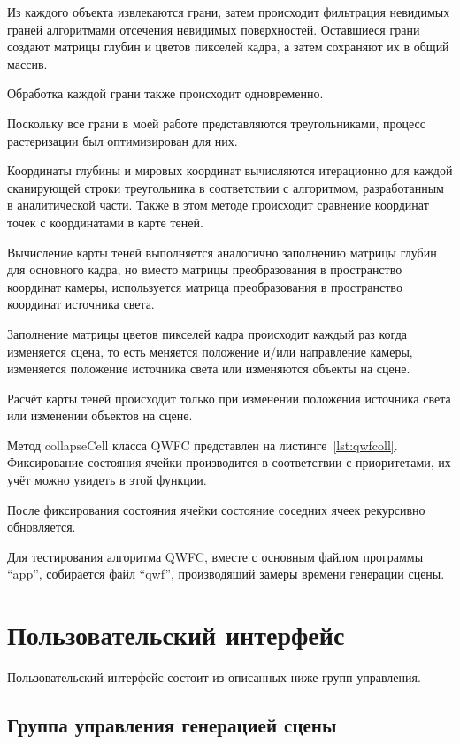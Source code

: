 Из каждого объекта извлекаются грани, затем происходит фильтрация невидимых граней алгоритмами отсечения невидимых поверхностей. Оставшиеся грани создают матрицы глубин и цветов пикселей кадра, а затем сохраняют их в общий массив. 

Обработка каждой грани также происходит одновременно. 

Поскольку все грани в моей работе представляются треугольниками, процесс растеризации был оптимизирован для них.

Координаты глубины и мировых координат вычисляются итерационно для каждой сканирующей строки треугольника в соответствии с алгоритмом, разработанным в аналитической части.
Также в этом методе происходит сравнение координат точек с координатами в карте теней.

Вычисление карты теней выполняется аналогично заполнению матрицы глубин для основного кадра, но вместо матрицы преобразования в пространство координат камеры, используется матрица преобразования в пространство координат источника света.

Заполнение матрицы цветов пикселей кадра происходит каждый раз когда изменяется сцена, то есть меняется положение и/или направление камеры, изменяется положение источника света или изменяются объекты на сцене.

Расчёт карты теней происходит только при изменении положения источника света или изменении объектов на сцене.

Метод collapseCell класса QWFC представлен на листинге~\ref{lst:qwfcoll}. Фиксирование состояния ячейки производится в соответствии с приоритетами, их учёт можно увидеть в этой функции.

После фиксирования состояния ячейки состояние соседних ячеек рекурсивно обновляется.

Для тестирования алгоритма QWFC, вместе с основным файлом программы ``app'', собирается файл ``qwf'', производящий замеры времени генерации сцены.

\section*{Пользовательский интерфейс}

Пользовательский интерфейс состоит из описанных ниже групп управления.

\subsection*{Группа управления генерацией сцены}

